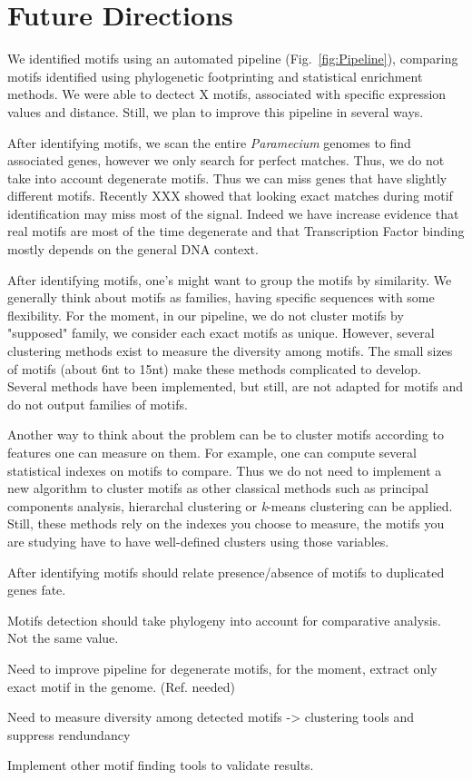 \section*{Future Directions}

We identified motifs using an automated pipeline (Fig.~\ref{fig:Pipeline}), comparing motifs identified using phylogenetic footprinting and statistical enrichment methods. We were able to dectect X motifs, associated with specific expression values and distance. Still, we plan to improve this pipeline in several ways.

After identifying motifs, we scan the entire \textit{Paramecium} genomes to find associated genes, however we only search for perfect matches. Thus, we do not take into account degenerate motifs. Thus we can miss genes that have slightly different motifs. Recently XXX showed that looking exact matches during motif identification may miss most of the signal. Indeed we have increase evidence that real motifs are most of the time degenerate and that Transcription Factor binding mostly depends on the general DNA context.

After identifying motifs, one's might want to group the motifs by similarity. We generally think about motifs as families, having specific sequences with some flexibility. For the moment, in our pipeline, we do not cluster motifs by "supposed" family, we consider each exact motifs as unique. However, several clustering methods exist to measure the diversity among motifs. The small sizes of motifs (about 6nt to 15nt) make these methods complicated to develop. Several methods have been implemented, but still, are not adapted for motifs and do not output families of motifs. 

Another way to think about the problem can be to cluster motifs according to features one can measure on them. For example, one can compute several statistical indexes on motifs to compare. Thus we do not need to implement a new algorithm to cluster motifs as other classical methods such as principal components analysis, hierarchal clustering or \textit{k}-means clustering can be applied. Still, these methods rely on the indexes you choose to measure, the motifs you are studying have to have well-defined clusters using those variables.

After identifying motifs should relate presence/absence of motifs to duplicated genes fate.

Motifs detection should take phylogeny into account for comparative analysis. Not the same value.

Need to improve pipeline for degenerate motifs, for the moment, extract only exact motif in the genome. (Ref. needed)

Need to measure diversity among detected motifs -> clustering tools and suppress rendundancy

Implement other motif finding tools to validate results.
